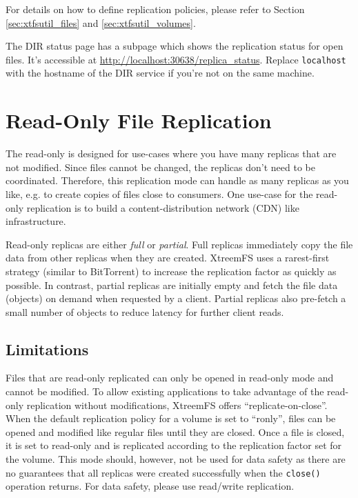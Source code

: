 \documentclass[a4paper,10pt]{book}
\begin{document}
For details on how to define replication policies, please refer to Section \ref{sec:xtfsutil_files} and \ref{sec:xtfsutil_volumes}.

The DIR status page has a subpage which shows the replication status for open files. It's accessible at \url{http://localhost:30638/replica_status}. Replace \texttt{localhost} with the hostname of the DIR service if you're not on the same machine.

\section{Read-Only File Replication}
\label{sec:ronly_replication}
The read-only is designed for use-cases where you have many replicas that are not modified. Since files cannot be changed, the replicas don't need to be coordinated. Therefore, this replication mode can handle as many replicas as you like, e.g. to create copies of files close to consumers. One use-case for the read-only replication is to build a content-distribution network (CDN) like infrastructure.

Read-only replicas are either \textit{full} or \textit{partial}. Full replicas immediately copy the file data from other replicas when they are created. XtreemFS uses a rarest-first strategy (similar to BitTorrent) to increase the replication factor as quickly as possible. In contrast, partial replicas are initially empty and fetch the file data (objects) on demand when requested by a client. Partial replicas also pre-fetch a small number of objects to reduce latency for further client reads.

\subsection{Limitations}
Files that are read-only replicated can only be opened in read-only mode and cannot be modified. To allow existing applications to take advantage of the read-only replication without modifications, XtreemFS offers ``replicate-on-close''. When the default replication policy for a volume is set to ``ronly'', files can be opened and modified like regular files until they are closed. Once a file is closed, it is set to read-only and is replicated according to the replication factor set for the volume. This mode should, however, not be used for data safety as there are no guarantees that all replicas were created successfully when the \texttt{close()} operation returns. For data safety, please use read/write replication.
\end{document}
